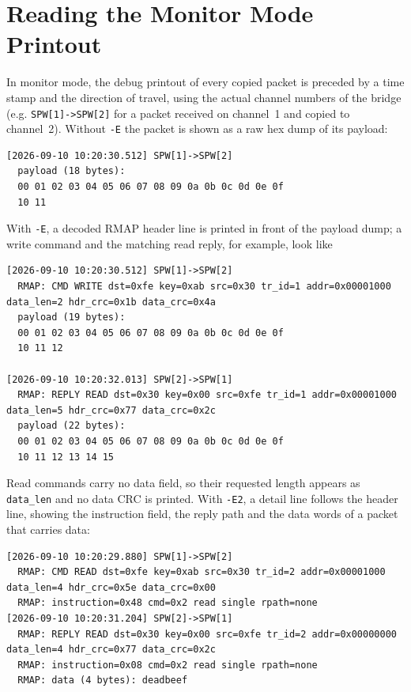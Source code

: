 \section{Reading the Monitor Mode Printout}
\label{sec:mondbg}

In monitor mode, the debug printout of every copied packet is preceded by a
time stamp and the direction of travel, using the actual channel numbers of the
bridge (e.g. \texttt{SPW[1]->SPW[2]} for a packet received on channel~1 and
copied to channel~2). Without \texttt{-E} the packet is shown as a raw hex dump
of its payload:

\begin{lstlisting}
[2026-09-10 10:20:30.512] SPW[1]->SPW[2]
  payload (18 bytes):
  00 01 02 03 04 05 06 07 08 09 0a 0b 0c 0d 0e 0f
  10 11
\end{lstlisting}

\noindent
With \texttt{-E}, a decoded \gls{RMAP} header line is printed in front of the
payload dump; a write command and the matching read reply, for example, look
like

\begin{lstlisting}
[2026-09-10 10:20:30.512] SPW[1]->SPW[2]
  RMAP: CMD WRITE dst=0xfe key=0xab src=0x30 tr_id=1 addr=0x00001000 data_len=2 hdr_crc=0x1b data_crc=0x4a
  payload (19 bytes):
  00 01 02 03 04 05 06 07 08 09 0a 0b 0c 0d 0e 0f
  10 11 12

[2026-09-10 10:20:32.013] SPW[2]->SPW[1]
  RMAP: REPLY READ dst=0x30 key=0x00 src=0xfe tr_id=1 addr=0x00001000 data_len=5 hdr_crc=0x77 data_crc=0x2c
  payload (22 bytes):
  00 01 02 03 04 05 06 07 08 09 0a 0b 0c 0d 0e 0f
  10 11 12 13 14 15
\end{lstlisting}

\noindent
Read commands carry no data field, so their requested length appears as
\texttt{data\_len} and no data CRC is printed. With \texttt{-E2}, a detail line
follows the header line, showing the instruction field, the reply path and the
data words of a packet that carries data:

\begin{lstlisting}
[2026-09-10 10:20:29.880] SPW[1]->SPW[2]
  RMAP: CMD READ dst=0xfe key=0xab src=0x30 tr_id=2 addr=0x00001000 data_len=4 hdr_crc=0x5e data_crc=0x00
  RMAP: instruction=0x48 cmd=0x2 read single rpath=none
[2026-09-10 10:20:31.204] SPW[2]->SPW[1]
  RMAP: REPLY READ dst=0x30 key=0x00 src=0xfe tr_id=2 addr=0x00000000 data_len=4 hdr_crc=0x77 data_crc=0x2c
  RMAP: instruction=0x08 cmd=0x2 read single rpath=none
  RMAP: data (4 bytes): deadbeef
\end{lstlisting}

